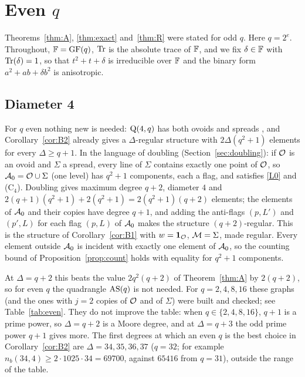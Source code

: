 
\section{Even \texorpdfstring{$q$}{q}}\label{sec:even}

Theorems~\ref{thm:A}, \ref{thm:exact} and~\ref{thm:R} were stated for odd $q$. Here $q=2^e$. Throughout, $\mathbb{F}=\mathrm{GF}(q)$, $\mathrm{Tr}$ is the absolute trace of $\mathbb{F}$, and we fix $\delta\in\mathbb{F}$ with $\mathrm{Tr}(\delta)=1$, so that $t^2+t+\delta$ is irreducible over $\mathbb{F}$ and the binary form $a^2+ab+\delta b^2$ is anisotropic.

\subsection{Diameter 4}
For $q$ even nothing new is needed: $\mathrm{Q}(4,q)$ has both ovoids and spreads \cite[Ch.~3]{PT}, and Corollary~\ref{cor:B2} already gives a $\Delta$-regular structure with $2\Delta(q^2+1)$ elements for every $\Delta\ge q+1$. In the language of doubling (Section~\ref{sec:doubling}): if $\mathcal{O}$ is an ovoid and $\Sigma$ a spread, every line of $\Sigma$ contains exactly one point of $\mathcal{O}$, so $\mathcal{A}_0=\mathcal{O}\cup\Sigma$ (one level) has $q^2+1$ components, each a flag, and satisfies \ref{L0} and \textup{(C$_4$)}. Doubling gives maximum degree $q+2$, diameter $4$ and $2(q+1)(q^2+1)+2(q^2+1)=2(q^2+1)(q+2)$ elements; the elements of $\mathcal{A}_0$ and their copies have degree $q+1$, and adding the anti-flags $(p,L')$ and $(p',L)$ for each flag $(p,L)$ of $\mathcal{A}_0$ makes the structure $(q+2)$-regular. This is the structure of Corollary~\ref{cor:B1} with $w=\mathbf 1_{\mathcal{O}}$, $\mathcal{M}=\Sigma$, made regular. Every element outside $\mathcal{A}_0$ is incident with exactly one element of $\mathcal{A}_0$, so the counting bound of Proposition~\ref{prop:count} holds with equality for $q^2+1$ components.

At $\Delta=q+2$ this beats the value $2q^2(q+2)$ of Theorem~\ref{thm:A} by $2(q+2)$, so for even $q$ the quadrangle $\mathrm{AS}(q)$ is not needed. For $q=2,4,8,16$ these graphs (and the ones with $j=2$ copies of $\mathcal{O}$ and of $\Sigma$) were built and checked; see Table~\ref{tab:even}. They do not improve the table: when $q\in\{2,4,8,16\}$, $q+1$ is a prime power, so $\Delta=q+2$ is a Moore degree, and at $\Delta=q+3$ the odd prime power $q+1$ gives more. The first degrees at which an even $q$ is the best choice in Corollary~\ref{cor:B2} are $\Delta=34,35,36,37$ ($q=32$; for example $n_b(34,4)\ge 2\cdot1025\cdot34=69700$, against $65416$ from $q=31$), outside the range of the table.

